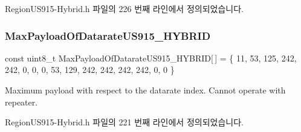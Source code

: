 Region\+U\+S915-\/\+Hybrid.\+h 파일의 226 번째 라인에서 정의되었습니다.

\mbox{\label{group___r_e_g_i_o_n_u_s915_h_y_b_ga0165d0e904aef148daa7b87353f58aca}} 
\subsubsection{\texorpdfstring{Max\+Payload\+Of\+Datarate\+U\+S915\+\_\+\+H\+Y\+B\+R\+ID}{MaxPayloadOfDatarateUS915\_HYBRID}}
{\footnotesize\ttfamily const uint8\+\_\+t Max\+Payload\+Of\+Datarate\+U\+S915\+\_\+\+H\+Y\+B\+R\+ID\mbox{[}$\,$\mbox{]} = \{ 11, 53, 125, 242, 242, 0, 0, 0, 53, 129, 242, 242, 242, 242, 0, 0 \}\hspace{0.3cm}{\ttfamily [static]}}

Maximum payload with respect to the datarate index. Cannot operate with repeater. 

Region\+U\+S915-\/\+Hybrid.\+h 파일의 221 번째 라인에서 정의되었습니다.

